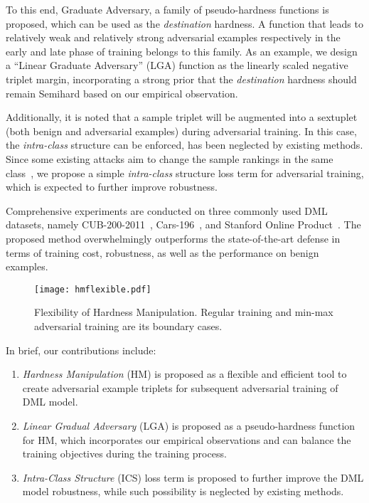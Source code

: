 \documentclass[10pt,twocolumn,letterpaper]{article}
\begin{document}

To this end, Graduate Adversary, a family of pseudo-hardness functions is
proposed, which can be used as the \emph{destination} hardness.
%
A function that leads to relatively weak and relatively strong adversarial
examples respectively in the early and late phase of training belongs to this
family.
%
As an example, we design a ``Linear Graduate Adversary'' (LGA)
function as the linearly scaled negative triplet margin, incorporating a strong
prior that the \emph{destination} hardness should remain Semihard
based on our empirical observation.


Additionally, it is noted that a sample triplet will be augmented into a
sextuplet (both benign and adversarial examples) during adversarial training.
%
In this case, the \emph{intra-class} structure can be enforced, has been
neglected by existing methods.
%
Since some existing attacks aim to change the sample rankings in the same
class~\cite{advrank},
%
we propose a simple \emph{intra-class} structure loss term for adversarial
training, which is expected to further improve robustness.

Comprehensive experiments are conducted on three commonly used DML datasets,
namely CUB-200-2011~\cite{cub200}, Cars-196~\cite{cars196}, and Stanford Online
Product~\cite{sop}.
%
The proposed method overwhelmingly outperforms the state-of-the-art defense in
terms of training cost, robustness, as well as the performance on benign
examples.

\begin{figure}
	\texttt{[image: hmflexible.pdf]}
	\vspace{-1.8em}
	\caption{Flexibility of Hardness Manipulation.
	Regular training and min-max adversarial training are its boundary cases.
	}
	\label{fig:hmflexible}
\end{figure}

In brief, our contributions include:
%
\begin{enumerate}[nosep, noitemsep, leftmargin=*]
	\item {\textit{Hardness Manipulation}} (HM) is proposed as a flexible and
		efficient tool to create adversarial example triplets for subsequent
		adversarial training of DML model.
	\item \textit{Linear Gradual Adversary} (LGA) is proposed as a
		pseudo-hardness function for HM, which incorporates our empirical
		observations and can balance the training objectives during the
		training process.
	\item \textit{Intra-Class Structure} (ICS) loss term is proposed to further
		improve the DML model robustness, while such possibility is neglected
		by existing methods. 
\end{enumerate}
\end{document}
